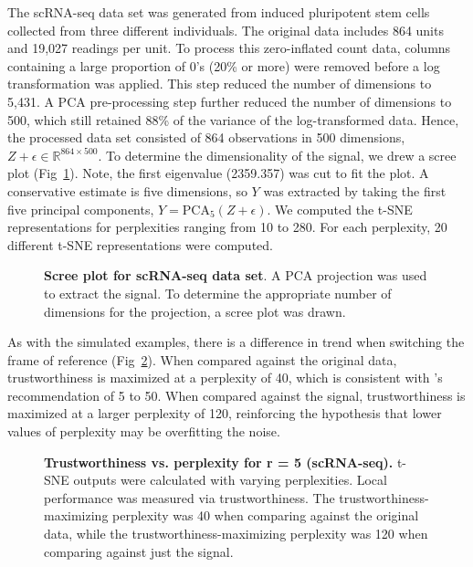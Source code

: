 \documentclass[10pt,letterpaper]{article}
\begin{document}
The scRNA-seq data set was generated from induced pluripotent stem cells collected from three different individuals. The original data includes 864 units and 19,027 readings per unit. To process this zero-inflated count data, columns containing a large proportion of 0's (20\% or more) were removed before a log transformation was applied. This step reduced the number of dimensions to 5,431. A PCA pre-processing step further reduced the number of dimensions to 500, which still retained 88\% of the variance of the log-transformed data. Hence, the processed data set consisted of 864 observations in 500 dimensions, $Z + \epsilon \in \mathbb{R}^{864 \times 500}$. To determine the dimensionality of the signal, we drew a scree plot (Fig~\ref{fig9}). Note, the first eigenvalue (2359.357) was cut to fit the plot. A conservative estimate is five dimensions, so $Y$ was extracted by taking the first five principal components, $Y = \textrm{PCA}_5(Z + \epsilon)$. We computed the t-SNE representations for perplexities ranging from 10 to 280. For each perplexity, 20 different t-SNE representations were computed.

\begin{figure}[!h]
\caption{{\bf Scree plot for scRNA-seq data set}.
A PCA projection was used to extract the signal. To determine the appropriate number of dimensions for the projection, a scree plot was drawn.}
\label{fig9}
\end{figure}

As with the simulated examples, there is a difference in trend when switching the frame of reference (Fig~\ref{fig10}). When compared against the original data, trustworthiness is maximized at a perplexity of 40, which is consistent with \cite{t-SNE}'s recommendation of 5 to 50. When compared against the signal, trustworthiness is maximized at a larger perplexity of 120, reinforcing the hypothesis that lower values of perplexity may be overfitting the noise.

\begin{figure}[!h]
\caption{{\bf Trustworthiness vs. perplexity for r = 5 (scRNA-seq).}
t-SNE outputs were calculated with varying perplexities. Local performance was measured via trustworthiness. The trustworthiness-maximizing perplexity was 40 when comparing against the original data, while the trustworthiness-maximizing perplexity was 120 when comparing against just the signal.}
\label{fig10}
\end{figure}
\end{document}
